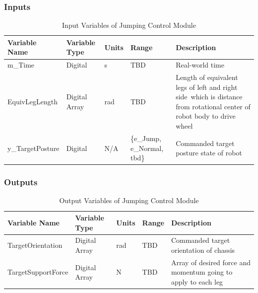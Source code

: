 \documentclass[12pt]{article}
\begin{document}
        \subsubsection{Inputs}        
            \begin{table}[H]
              \centering
                \caption{Input Variables of Jumping Control Module} \label{tbl:Input Variables of Jumping Control Module}
              \begin{tabularx}{\textwidth}{|p{3cm}|p{1.2cm}|p{1.1cm}|p{1.5cm}|X|}
                \hline Variable Name & Variable Type & Units & Range & Description \\
                \hline m\_Time & Digital & \unit{\second}  & TBD & Real-world time\\                
                \hline EquivLegLength & Digital Array & rad & TBD & Length of equivalent legs of left and right side\, which is distance from rotational center of robot body to drive wheel\\
                \hline y\_TargetPosture & Digital & N/A &\{e\_Jump, e\_Normal, \acrshort{tbd}\} & Commanded target posture state of robot  \\
                \hline
              \end{tabularx}
            \end{table}
        
        \subsubsection{Outputs} 
            \begin{table}[H]
                \centering
                \caption{Output Variables of Jumping Control Module} \label{tbl:Output Variables of Jumping Control Module}
                  \begin{tabularx}{\textwidth}{|p{4cm}|p{1.5cm}|p{1.25cm}|p{1cm}|X|}
                    \hline Variable Name & Variable Type & Units & Range & Description \\
                    \hline TargetOrientation & Digital Array  & rad & TBD & Commanded target orientation of chassis\\
                    \hline TargetSupportForce & Digital Array & N & TBD & Array of desired force and momentum going to apply to each leg\\
                    \hline                        
             \end{tabularx}
            \end{table}
\end{document}
